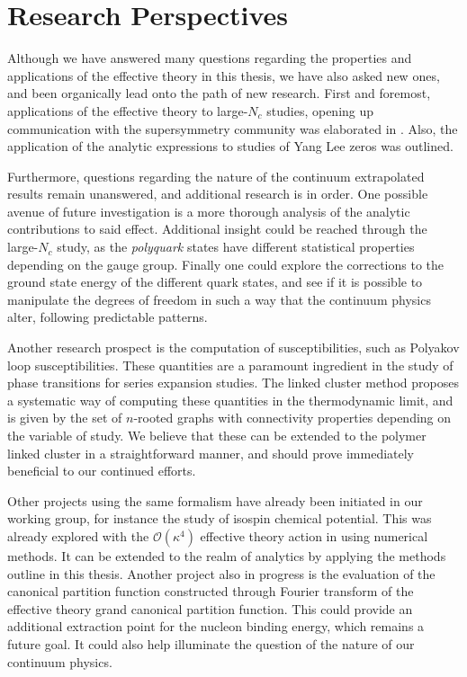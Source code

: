 \chapter{Research Perspectives}

Although we have answered many questions regarding the properties and
applications of the effective theory in this thesis, we have also asked new
ones, and been organically lead onto the path of new research. First and
foremost, applications of the effective theory to large-$N_c$ studies, opening
up communication with the supersymmetry community was elaborated in
. Also, the application of the analytic expressions
to studies of Yang Lee zeros was outlined.

Furthermore, questions regarding the nature of the continuum extrapolated
results remain unanswered, and additional research is in order. One possible
avenue of future investigation is a more thorough analysis of the analytic
contributions to said effect. Additional insight could be reached through the
large-$N_c$ study, as the \emph{polyquark} states have different statistical
properties depending on the gauge group. Finally one could explore the
corrections to the ground state energy of the different quark states, and see if
it is possible to manipulate the degrees of freedom in such a way that the
continuum physics alter, following predictable patterns.

Another research prospect is the computation of susceptibilities, such as
Polyakov loop susceptibilities. These quantities are a paramount ingredient in
the study of phase transitions for series expansion studies. The linked cluster
method proposes a systematic way of computing these quantities in the
thermodynamic limit, and is given by the set of $n$-rooted graphs with
connectivity properties depending on the variable of study. We believe that
these can be extended to the polymer linked cluster in a straightforward manner,
and should prove immediately beneficial to our continued efforts.

Other projects using the same formalism have already been initiated in our
working group, for instance the study of isospin chemical potential. This was already
explored with the $\mathcal{O}(\kappa^4)$ effective theory action in
\citep{Langelage:2014vpa} using numerical methods. It can be extended to the
realm of analytics by applying the methods outline in this thesis. Another
project also in progress is the evaluation of the canonical partition function
constructed through Fourier transform of the effective theory grand canonical
partition function. This could provide an additional extraction point for the
nucleon binding energy, which remains a future goal. It could also help
illuminate the question of the nature of our continuum physics.

